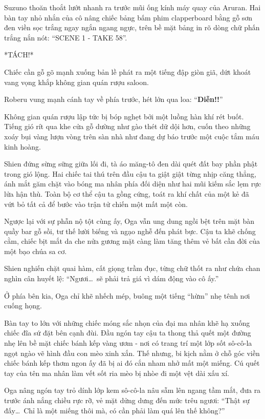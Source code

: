 \documentclass[../main.tex]{subfiles}
\begin{document}
Suzuno thoăn thoắt lướt nhanh ra trước mũi ống kính máy quay của Aruran. Hai bàn tay nhỏ nhắn của cô nâng chiếc bảng bấm phim clapperboard bằng gỗ sơn đen viền sọc trắng ngay ngắn ngang ngực, trên bề mặt bảng in rõ dòng chữ phấn trắng nắn nót: ``SCENE 1 - TAKE 58''.

*TÁCH!*

Chiếc cần gỗ gõ mạnh xuống bản lề phát ra một tiếng đập giòn giã, dứt khoát vang vọng khắp không gian quán rượu saloon.

Roberu vung mạnh cánh tay về phía trước, hét lớn qua loa: ``\textbf{Diễn!!}''

\il

Không gian quán rượu lập tức bị bóp nghẹt bởi một luồng hàn khí rét buốt. Tiếng gió rít qua khe cửa gỗ dường như gào thét dữ dội hơn, cuốn theo những xoáy bụi vàng lượn vòng trên sàn nhà như đang dự báo trước một cuộc tắm máu kinh hoàng.

Shien đứng sừng sững giữa lối đi, tà áo măng-tô đen dài quét đất bay phần phật trong gió lộng. Hai chiếc tai thú trên đầu cậu ta giật giật từng nhịp căng thẳng, ánh mắt găm chặt vào bóng ma nhân phía đối diện như hai mũi kiếm sắc lẹm rực lửa hận thù. Toàn bộ cơ thể cậu ta gồng cứng, toát ra khí chất của một kẻ đã vứt bỏ tất cả để bước vào trận tử chiến một mất một còn.

Ngược lại với sự phẫn nộ tột cùng ấy, Oga vẫn ung dung ngồi bệt trên mặt bàn quầy bar gỗ sồi, tư thế lười biếng và ngạo nghễ đến phát bực. Cậu ta khẽ chống cằm, chiếc bịt mắt da che nửa gương mặt càng làm tăng thêm vẻ bất cần đời của một bạo chúa sa cơ.

Shien nghiến chặt quai hàm, cất giọng trầm đục, từng chữ thốt ra như chứa chan nghìn cân huyết lệ: ``Ngươi\dots\ sẽ phải trả giá vì dám động vào cô ấy.''

Ở phía bên kia, Oga chỉ khẽ nhếch mép, buông một tiếng ``hừm'' nhẹ tênh nơi cuống họng.

Bàn tay to lớn với những chiếc móng sắc nhọn của đại ma nhân khẽ hạ xuống chiếc đĩa sứ đặt bên cạnh đùi. Đầu ngón tay cậu ta thong thả quết một đường nhẹ lên bề mặt chiếc bánh kếp vàng ươm - nơi có trang trí một lớp sốt sô-cô-la ngọt ngào vẽ hình đầu con mèo xinh xắn. Thế nhưng, bi kịch nằm ở chỗ góc viền chiếc bánh kếp thơm ngon ấy đã bị ai đó cắn nham nhở mất một miếng. Cú quết tay của tên ma nhân làm vết sốt ria mèo bị nhòe đi một vệt dài xấu xí.


Oga nâng ngón tay trỏ dính lớp kem sô-cô-la nâu sẫm lên ngang tầm mắt, đưa ra trước ánh nắng chiều rực rỡ, vẻ mặt dửng dưng đến mức trêu ngươi: ``Thật sự đấy\dots\ Chỉ là một miếng thôi mà, có cần phải làm quá lên thế không?''
\end{document}
